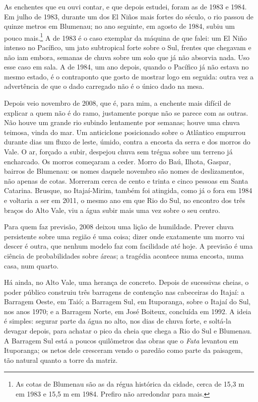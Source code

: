 \documentclass[
  brazilian,
  11pt,
  openany]{book}
\begin{document}
As enchentes que eu ouvi contar, e que depois estudei, foram as de 1983
e 1984. Em julho de 1983, durante um dos El Niños mais fortes do século,
o rio passou de quinze metros em Blumenau; no ano seguinte, em agosto de
1984, subiu um pouco mais.\footnote{As cotas de Blumenau são as da régua
  histórica da cidade, cerca de 15,3 m em 1983 e 15,5 m em 1984. Prefiro
  não arredondar para mais.} A de 1983 é o caso exemplar da máquina de
que falei: um El Niño intenso no Pacífico, um jato subtropical forte
sobre o Sul, frentes que chegavam e não iam embora, semanas de chuva
sobre um solo que já não absorvia nada. Uso esse caso em sala. A de
1984, um ano depois, quando o Pacífico já não estava no mesmo estado, é
o contraponto que gosto de mostrar logo em seguida: outra vez a
advertência de que o dado carregado não é o único dado na mesa.

Depois veio novembro de 2008, que é, para mim, a enchente mais difícil
de explicar a quem não é do ramo, justamente porque não se parece com as
outras. Não houve um grande rio subindo lentamente por semanas; houve
uma chuva teimosa, vinda do mar. Um anticiclone posicionado sobre o
Atlântico empurrou durante dias um fluxo de leste, úmido, contra a
encosta da serra e dos morros do Vale. O ar, forçado a subir, despejou
chuva sem trégua sobre um terreno já encharcado. Os morros começaram a
ceder. Morro do Baú, Ilhota, Gaspar, bairros de Blumenau: os nomes
daquele novembro são nomes de deslizamentos, não apenas de cotas.
Morreram cerca de cento e trinta e cinco pessoas em Santa Catarina.
Brusque, no Itajaí-Mirim, também foi atingida, como já o fora em 1984 e
voltaria a ser em 2011, o mesmo ano em que Rio do Sul, no encontro dos
três braços do Alto Vale, viu a água subir mais uma vez sobre o seu
centro.

Para quem faz previsão, 2008 deixou uma lição de humildade. Prever chuva
persistente sobre uma região é uma coisa; dizer onde exatamente um morro
vai descer é outra, que nenhum modelo faz com facilidade até hoje. A
previsão é uma ciência de probabilidades sobre áreas; a tragédia
acontece numa encosta, numa casa, num quarto.

Há ainda, no Alto Vale, uma herança de concreto. Depois de sucessivas
cheias, o poder público construiu três barragens de contenção nas
cabeceiras do Itajaí: a Barragem Oeste, em Taió; a Barragem Sul, em
Ituporanga, sobre o Itajaí do Sul, nos anos 1970; e a Barragem Norte, em
José Boiteux, concluída em 1992. A ideia é simples: segurar parte da
água no alto, nos dias de chuva forte, e soltá-la devagar depois, para
achatar o pico da cheia que chega a Rio do Sul e Blumenau. A Barragem
Sul está a poucos quilômetros das obras que o \emph{Fata} levantou em
Ituporanga; os netos dele cresceram vendo o paredão como parte da
paisagem, tão natural quanto a torre da matriz.
\end{document}
